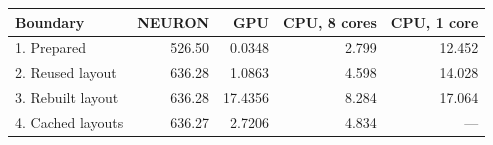 \begin{tabular}{lrrrr}
\toprule
Boundary & NEURON & GPU & CPU, 8 cores & CPU, 1 core\\
\midrule
1. Prepared & 526.50 & 0.0348 & 2.799 & 12.452 \\
2. Reused layout & 636.28 & 1.0863 & 4.598 & 14.028 \\
3. Rebuilt layout & 636.28 & 17.4356 & 8.284 & 17.064 \\
4. Cached layouts & 636.27 & 2.7206 & 4.834 & --- \\
\bottomrule
\end{tabular}
